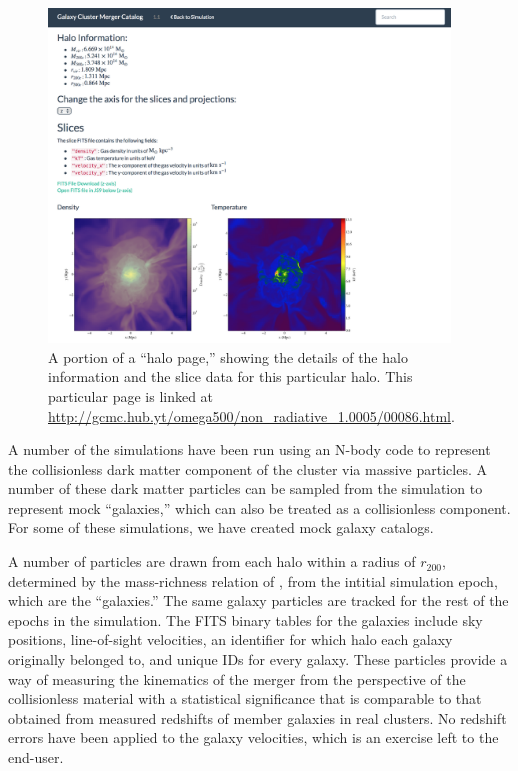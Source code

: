 \documentclass{emulateapj}
\begin{document}
\begin{figure}
\begin{center}
\includegraphics[width=0.95\textwidth]{halo_page.eps}
\caption{A portion of a ``halo page,'' showing the details of the halo information and the slice data for this particular halo. This particular page is linked at \url{http://gcmc.hub.yt/omega500/non_radiative_1.0005/00086.html}.}
\end{center}
\end{figure}

A number of the simulations have been run using an N-body code to represent the collisionless dark matter component of the cluster via massive particles. A number of these dark matter particles can be sampled from the simulation to represent mock ``galaxies,'' which can also be treated as a collisionless component. For some of these simulations, we have created mock galaxy catalogs.

A number of particles are drawn from each halo within a radius of $r_{200}$, determined by the mass-richness relation of \citet{for14}, from the intitial simulation epoch, which are the ``galaxies.'' The same galaxy particles are tracked for the rest of the epochs in the simulation. The FITS binary tables for the galaxies include sky positions, line-of-sight velocities, an identifier for which halo each galaxy originally belonged to, and unique IDs for every galaxy. These particles provide a way of measuring the kinematics of the merger from the perspective of the collisionless material with a statistical significance that is comparable to that obtained from measured redshifts of member galaxies in real clusters. No redshift errors have been applied to the galaxy velocities, which is an exercise left to the end-user.
\end{document}

